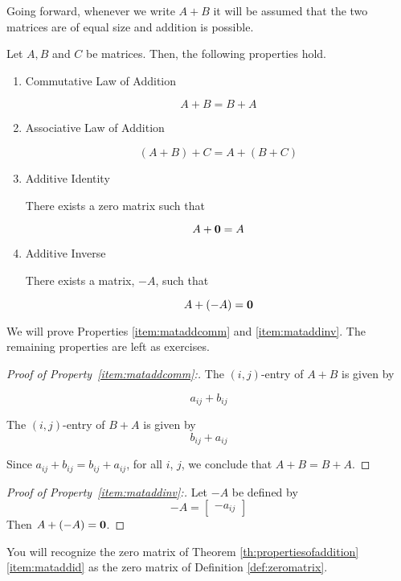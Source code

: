 \documentclass{ximera}
\begin{document}
Going forward, whenever we write $A+B$ it will be assumed that the two matrices are of equal size and addition is possible.

\begin{theorem}\label{th:propertiesofaddition}
Let $A,B$ and $C$ be matrices. Then, the following properties  hold. 

\begin{enumerate}
\item\label{item:mataddcomm} Commutative Law of Addition

$$A+B=B+A$$  


\item \label{item:mataddass} Associative Law of Addition

$$\left( A+B\right) +C=A+\left( B+C\right) $$


\item\label{item:mataddid} Additive Identity
\begin{center}
There exists a zero matrix such that
\end{center}
$$A+{\bf 0}=A$$


\item\label{item:mataddinv} Additive Inverse
\begin{center}
There exists a matrix, $-A$, such that
\end{center}
$$A+\left( -A\right) ={\bf 0} $$

\end{enumerate}
\end{theorem}
We will prove Properties \ref{item:mataddcomm} and \ref{item:mataddinv}.  The remaining properties are left as exercises.
\begin{proof}[Proof of Property~\ref{item:mataddcomm}:]
The $(i,j)$-entry of $A+B$ is given by

$$a_{ij}+b_{ij}$$

The $(i,j)$-entry of $B+A$ is given by
$$b_{ij}+a_{ij}$$

Since $a_{ij}+b_{ij}=b_{ij}+a_{ij}$, for all $i$, $j$, we conclude that $A+B=B+A$.
\end{proof}

\begin{proof}[Proof of Property~\ref{item:mataddinv}:]
Let $-A$ be defined by
$$-A=\begin{bmatrix}-a_{ij}\end{bmatrix}$$
Then $A+(-A)={\bf 0}$.
\end{proof}

You will recognize the zero matrix of Theorem \ref{th:propertiesofaddition}\ref{item:mataddid} as the zero matrix of Definition \ref{def:zeromatrix}. 
\end{document}
